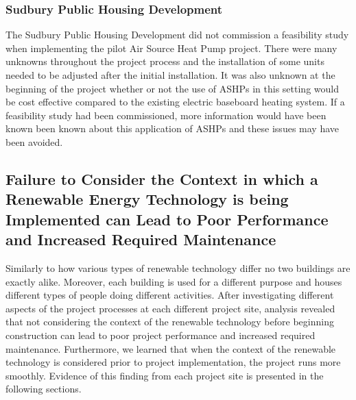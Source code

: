 \subsubsection{Sudbury Public Housing Development}
\par The Sudbury Public Housing Development did not commission a feasibility study when implementing the pilot Air Source Heat Pump project. There were many unknowns throughout the project process and the installation of some units needed to be adjusted after the initial installation. It was also unknown at the beginning of the project whether or not the use of ASHPs in this setting would be cost effective compared to the existing electric baseboard heating system. If a feasibility study had been commissioned, more information would have been known been known about this application of ASHPs and these issues may have been avoided.

\subsection{Failure to Consider the Context in which a Renewable Energy Technology is being Implemented can Lead to Poor Performance and Increased Required Maintenance}
\par Similarly to how various types of renewable technology differ no two buildings are exactly alike. Moreover, each building is used for a different purpose and houses different types of people doing different activities. After investigating different aspects of the project processes at each different project site, analysis revealed that not considering the context of the renewable technology before beginning construction can lead to poor project performance and increased required maintenance. Furthermore, we learned that when the context of the renewable technology is considered prior to project implementation, the project runs more smoothly. Evidence of this finding from each project site is presented in the following sections.

